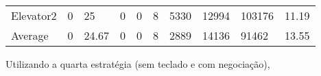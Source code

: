 ﻿\documentclass[a4paper]{article}
\begin{document}
\begin{table}[h]
\begin{tabular}{@{}llllllllll@{}}
Elevator2 & 0        & 25            & 0           & 0                                                               & 8                                                                  & 5330                                                         & 12994                                                 & 103176                                                   & 11.19         \\
Average   & 0     & 24.67         & 0        & 0                                                               & 8                                                              & 2889                                                         & 14136                                                 &  91462                                                  & 13.55         \\ \bottomrule
\end{tabular}
\end{table}

\newpage

Utilizando a quarta estratégia (sem teclado e com negociação),
\end{document}
